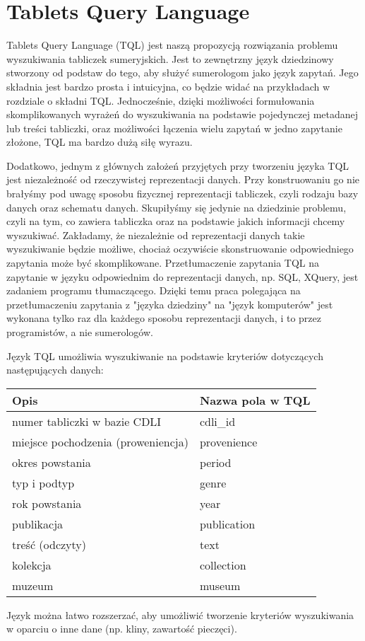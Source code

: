 \chapter{Tablets Query Language}

Tablets Query Language (TQL) jest naszą propozycją rozwiązania problemu wyszukiwania tabliczek sumeryjskich.
Jest to zewnętrzny język dziedzinowy stworzony od podstaw do tego, aby służyć sumerologom jako język zapytań.
Jego składnia jest bardzo prosta i intuicyjna, co będzie widać na przykładach w rozdziale o składni TQL.
Jednocześnie, dzięki możliwości formułowania skomplikowanych wyrażeń do wyszukiwania na podstawie pojedynczej
metadanej lub treści tabliczki, oraz możliwości łączenia wielu zapytań w jedno zapytanie złożone,
TQL ma bardzo dużą siłę wyrazu.

Dodatkowo, jednym z głównych założeń przyjętych przy tworzeniu języka TQL jest niezależność od rzeczywistej
reprezentacji danych. Przy konstruowaniu go nie brałyśmy pod uwagę sposobu fizycznej reprezentacji tabliczek,
czyli rodzaju bazy danych oraz schematu danych. Skupiłyśmy się jedynie na dziedzinie problemu, czyli na tym,
co zawiera tabliczka oraz na podstawie jakich informacji chcemy wyszukiwać. Zakładamy, że niezależnie od
reprezentacji danych takie wyszukiwanie będzie możliwe, chociaż oczywiście skonstruowanie odpowiedniego
zapytania może być skomplikowane. Przetłumaczenie zapytania TQL na zapytanie w języku odpowiednim do
reprezentacji danych, np. SQL, XQuery, jest zadaniem programu tłumaczącego. Dzięki temu praca polegająca
na przetłumaczeniu zapytania z "języka dziedziny" na "język komputerów" jest wykonana tylko raz dla każdego
sposobu reprezentacji danych, i to przez programistów, a nie sumerologów.

Język TQL umożliwia wyszukiwanie na podstawie kryteriów dotyczących następujących danych:
\begin{longtable}{|p{3in}|p{3in}|}
\hline
{\bf Opis} & {\bf Nazwa pola w TQL}\\
\hline
\endhead
numer tabliczki w bazie CDLI & cdli\_id
\\
\hline
miejsce pochodzenia (proweniencja) & provenience
\\
\hline
okres powstania & period
\\
\hline
typ i podtyp & genre
\\
\hline
rok powstania & year
\\
\hline
publikacja & publication
\\
\hline
treść (odczyty)& text
\\
\hline
kolekcja & collection
\\
\hline
muzeum & museum
\\
\hline
\end{longtable}
Język można łatwo rozszerzać, aby umożliwić tworzenie kryteriów wyszukiwania w oparciu o inne dane
(np. kliny, zawartość pieczęci).

